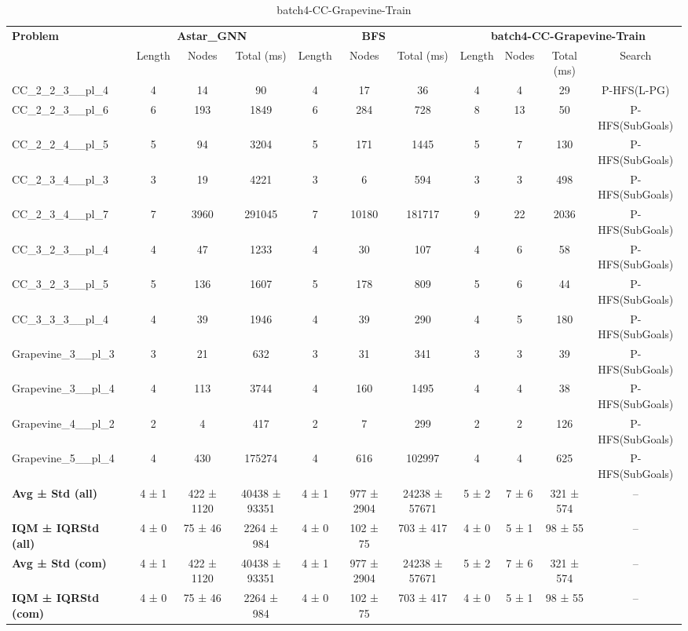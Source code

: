 \begin{table}[!ht]
\centering
\scriptsize
\begin{tabular}{l|ccc|ccc|cccc}
\multirow{2}{*}{\textbf{Problem}} & \multicolumn{3}{c|}{\textbf{Astar\_GNN}} & \multicolumn{3}{c|}{\textbf{BFS}} & \multicolumn{4}{c}{\textbf{batch4-CC-Grapevine-Train}} \\
\cline{2-11}
& Length & Nodes & Total (ms) & Length & Nodes & Total (ms) & Length & Nodes & Total (ms) & Search \\
\hline
CC\_2\_2\_3\_\_pl\_4 & 4 & 14 & 90 & 4 & 17 & 36 & 4 & 4 & 29 & P-HFS(L-PG) \\
CC\_2\_2\_3\_\_pl\_6 & 6 & 193 & 1849 & 6 & 284 & 728 & 8 & 13 & 50 & P-HFS(SubGoals) \\
CC\_2\_2\_4\_\_pl\_5 & 5 & 94 & 3204 & 5 & 171 & 1445 & 5 & 7 & 130 & P-HFS(SubGoals) \\
CC\_2\_3\_4\_\_pl\_3 & 3 & 19 & 4221 & 3 & 6 & 594 & 3 & 3 & 498 & P-HFS(SubGoals) \\
CC\_2\_3\_4\_\_pl\_7 & 7 & 3960 & 291045 & 7 & 10180 & 181717 & 9 & 22 & 2036 & P-HFS(SubGoals) \\
CC\_3\_2\_3\_\_pl\_4 & 4 & 47 & 1233 & 4 & 30 & 107 & 4 & 6 & 58 & P-HFS(SubGoals) \\
CC\_3\_2\_3\_\_pl\_5 & 5 & 136 & 1607 & 5 & 178 & 809 & 5 & 6 & 44 & P-HFS(SubGoals) \\
CC\_3\_3\_3\_\_pl\_4 & 4 & 39 & 1946 & 4 & 39 & 290 & 4 & 5 & 180 & P-HFS(SubGoals) \\
Grapevine\_3\_\_pl\_3 & 3 & 21 & 632 & 3 & 31 & 341 & 3 & 3 & 39 & P-HFS(SubGoals) \\
Grapevine\_3\_\_pl\_4 & 4 & 113 & 3744 & 4 & 160 & 1495 & 4 & 4 & 38 & P-HFS(SubGoals) \\
Grapevine\_4\_\_pl\_2 & 2 & 4 & 417 & 2 & 7 & 299 & 2 & 2 & 126 & P-HFS(SubGoals) \\
Grapevine\_5\_\_pl\_4 & 4 & 430 & 175274 & 4 & 616 & 102997 & 4 & 4 & 625 & P-HFS(SubGoals) \\
\hline
\textbf{Avg ± Std (all)} & 4 ± 1 & 422 ± 1120 & 40438 ± 93351 & 4 ± 1 & 977 ± 2904 & 24238 ± 57671 & 5 ± 2 & 7 ± 6 & 321 ± 574 & -- \\
\textbf{IQM ± IQRStd (all)} & 4 ± 0 & 75 ± 46 & 2264 ± 984 & 4 ± 0 & 102 ± 75 & 703 ± 417 & 4 ± 0 & 5 ± 1 & 98 ± 55 & -- \\
\textbf{Avg ± Std (com)} & 4 ± 1 & 422 ± 1120 & 40438 ± 93351 & 4 ± 1 & 977 ± 2904 & 24238 ± 57671 & 5 ± 2 & 7 ± 6 & 321 ± 574 & -- \\
\textbf{IQM ± IQRStd (com)} & 4 ± 0 & 75 ± 46 & 2264 ± 984 & 4 ± 0 & 102 ± 75 & 703 ± 417 & 4 ± 0 & 5 ± 1 & 98 ± 55 & -- \\
\end{tabular}
\caption{batch4-CC-Grapevine-Train}
\label{tab:batch4_CC-Grapevine_comparison_train}
\end{table}
